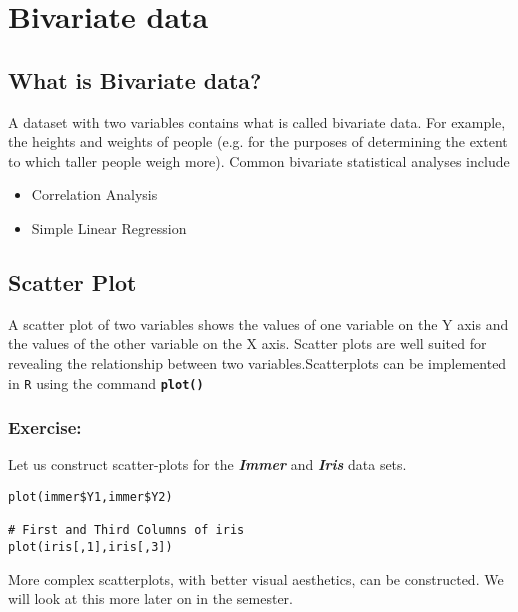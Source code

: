 \documentclass[a4paper,12pt]{article}
\begin{document}
\section{Bivariate data}
\subsection{What is Bivariate data?}

A dataset with two variables contains what is called bivariate data. For example, the heights and weights of people (e.g. for the purposes of determining the extent to which taller people weigh more). Common bivariate statistical analyses include
\begin{itemize}
\item Correlation Analysis
\item Simple Linear Regression
\end{itemize}

\subsection{Scatter Plot} A scatter plot of two variables shows the values of one variable on the Y axis and the values of the other variable on the X axis. Scatter plots are well suited for revealing the relationship between two variables.Scatterplots can be implemented in \texttt{R} using the command \texttt{\textbf{plot()}}

\subsubsection*{Exercise:} Let us construct scatter-plots for the \textbf{\textit{Immer}} and \textbf{\textit{Iris}} data sets.

\begin{framed}
\begin{verbatim}
plot(immer$Y1,immer$Y2)

# First and Third Columns of iris
plot(iris[,1],iris[,3])
\end{verbatim}
\end{framed}
More complex scatterplots, with better visual aesthetics, can be constructed. We will look at this more later on in the semester.
\end{document}
